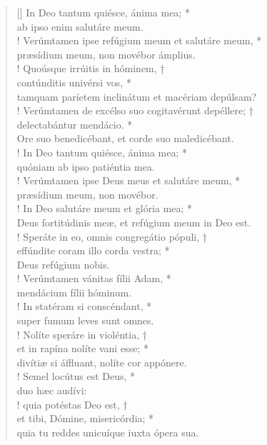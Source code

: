 \begin{verse}[\versewidth]
In Deo tantum quiésce, ánima mea; *\\
ab ipso enim salutáre meum.\\!
\vin Verúmtamen ipse refúgium meum et salutáre meum, *\\
\vin præsídium meum, non movébor ámplius.\\!
Quoúsque irrúitis in hóminem, †\\
contúnditis univérsi vos, *\\
tamquam paríetem inclinátum et macériam depúlsam?\\!
\vin Verúmtamen de excélso suo cogitavérunt depéllere; †\\
\vin delectabántur mendácio. *\\
\vin Ore suo benedicébant, et corde suo maledicébant.\\!
In Deo tantum quiésce, ánima mea; *\\
quóniam ab ipso patiéntia mea.\\!
\vin Verúmtamen ipse Deus meus et salutáre meum, *\\
\vin præsídium meum, non movébor.\\!
In Deo salutáre meum et glória mea; *\\
Deus fortitúdinis meæ, et refúgium meum in Deo est.\\!
\vin Speráte in eo, omnis congregátio pópuli, †\\
\vin effúndite coram illo corda vestra; *\\
\vin Deus refúgium nobis.\\!
Verúmtamen vánitas fílii Adam, *\\
mendácium fílii hóminum.\\!
\vin In statéram si conscéndant, *\\
\vin super fumum leves sunt omnes.\\!
Nolíte speráre in violéntia, †\\
et in rapína nolíte vani esse; *\\
divítiæ si áffluant, nolíte cor appónere.\\!
\vin Semel locútus est Deus, *\\
\vin duo hæc audívi:\\!
quia potéstas Deo est, †\\
et tibi, Dómine, misericórdia; *\\
quia tu reddes unicuíque iuxta ópera sua.\\
\end{verse}
\vspace{1cm}


